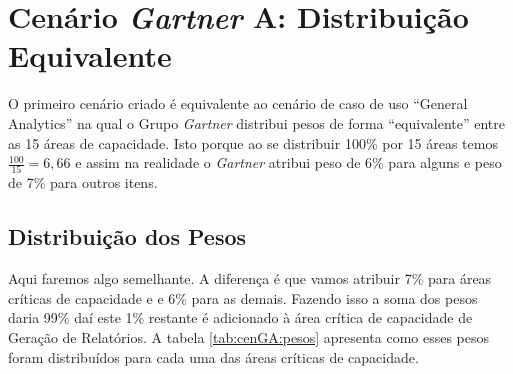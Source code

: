 \newcommand{\cenGA}{Cenário \emph{Gartner} A: Distribuição Equivalente} 
\section{\cenGA}
\label{sec-cenga}
    O primeiro cenário criado é equivalente ao cenário de caso de uso ``General Analytics'' na qual o Grupo \emph{Gartner} distribui pesos de forma ``equivalente'' entre as 15 áreas de capacidade. Isto porque ao se distribuir 100\% por 15 áreas temos $\frac{100}{15} = 6,66$ e assim na realidade o \emph{Gartner} atribui peso de 6\% para alguns e peso de 7\% para outros itens.
    
\subsection*{Distribuição dos Pesos}    
    
    Aqui faremos algo semelhante. A diferença é que vamos atribuir 7\% para áreas críticas de capacidade \MUST e \SHOULD e 6\% para as demais. Fazendo isso a soma dos pesos daria 99\% daí este 1\% restante é adicionado à área crítica de capacidade de Geração de Relatórios. A tabela \ref{tab:cenGA:pesos} apresenta como esses pesos foram distribuídos para cada uma das áreas críticas de capacidade.

